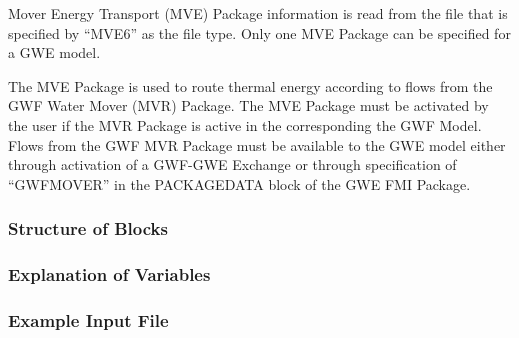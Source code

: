 Mover Energy Transport (MVE) Package information is read from the file that is specified by ``MVE6'' as the file type.  Only one MVE Package can be specified for a GWE model.  

The MVE Package is used to route thermal energy according to flows from the GWF Water Mover (MVR) Package.  The MVE Package must be activated by the user if the MVR Package is active in the corresponding the GWF Model.  Flows from the GWF MVR Package must be available to the GWE model either through activation of a GWF-GWE Exchange or through specification of ``GWFMOVER'' in the PACKAGEDATA block of the GWE FMI Package.  

\vspace{5mm}
\subsubsection{Structure of Blocks}


\vspace{5mm}
\subsubsection{Explanation of Variables}
\begin{description}

\end{description}

\vspace{5mm}
\subsubsection{Example Input File}



